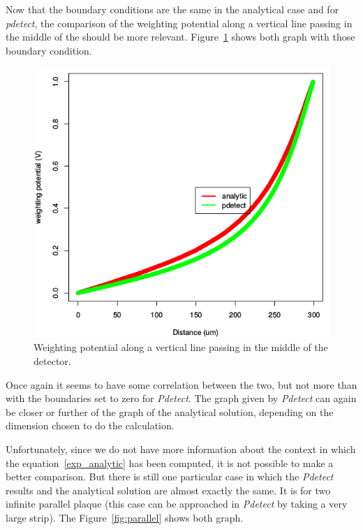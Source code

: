 \documentclass[11pt]{article}
\begin{document}
			Now that the boundary conditions are the same in the analytical case and for \textit{pdetect},
			the comparison of the weighting potential along a vertical line passing in the middle of the
			should be more relevant. Figure~\ref{fig:semi_free_conditions} shows both graph with those boundary
			condition.

			\begin{figure}[H]
				\center
				\includegraphics[scale=0.45]{images/boundary_conditions/semi_free_conditions.png}
				\caption{Weighting potential along a vertical line passing in the middle of the detector.}
				\label{fig:semi_free_conditions}
			\end{figure}

			Once again it seems to have some correlation between the two, but not more than with the boundaries
			set to zero for \textit{Pdetect}. The graph given by \textit{Pdetect} can again be closer or further
			of the graph of the analytical solution, depending on the dimension chosen to do the calculation.

			Unfortunately, since we do not have more information about the context in which the equation~\ref{exp_analytic}
			has been computed, it is not possible to make a better comparison. But there is still one particular
			case in which the \textit{Pdetect} results and the analytical solution are almost exactly the same.
			It is for two infinite parallel plaque (this case can be approached in \textit{Pdetect} by taking
			a very large strip). The Figure~\ref{fig:parallel} shows both graph.
\end{document}
